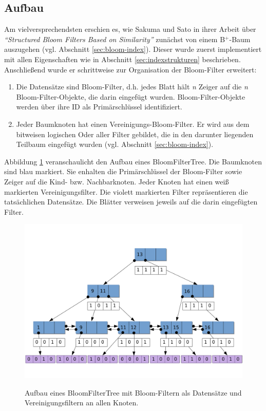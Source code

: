 \subsection{Aufbau}\label{sec:aufbau} 
Am vielversprechendsten erschien es, wie Sakuma und Sato in ihrer Arbeit über \textit{"`Structured Bloom Filters Based on Similarity"'} \cite{Sakuma2011} zunächst von einem B$^+$-Baum auszugehen (vgl. Abschnitt \ref{sec:bloom-index}). Dieser wurde zuerst implementiert mit allen Eigenschaften wie in Abschnitt \ref{sec:indexstrukturen} beschrieben. Anschließend wurde er schrittweise zur Organisation der Bloom-Filter erweitert: 
\begin{enumerate}
\setlength{\itemsep}{20pt}
	\item Die Datensätze sind Bloom-Filter, d.h. jedes Blatt hält \textit{n} Zeiger auf die \textit{n} Bloom-Filter-Objekte, die darin eingefügt wurden. Bloom-Filter-Objekte werden über ihre ID als Primärschlüssel identifiziert. 
	\item Jeder Baumknoten hat einen Vereinigungs-Bloom-Filter. Er wird aus dem bitweisen logischen Oder aller Filter gebildet, die in den darunter liegenden Teilbaum eingefügt wurden (vgl. Abschnitt \ref{sec:bloom-index}).
\end{enumerate}
Abbildung \ref{fig:pic6} veranschaulicht den Aufbau eines BloomFilterTree. Die Baumknoten sind blau markiert. Sie enhalten die Primärschlüssel der Bloom-Filter sowie Zeiger auf die Kind- bzw. Nachbarknoten. Jeder Knoten hat einen weiß markierten Vereinigungsfilter. Die violett markierten Filter repräsentieren die tatsächlichen Datensätze. Die Blätter verweisen jeweils auf die darin eingefügten Filter.
\begin{figure}[hpbt]
  \centering
  \includegraphics[width=1.0\textwidth]{pictures/bloom-filter-tree2.png}\\
  \caption[Aufbau eines BloomFilterTree]{Aufbau eines BloomFilterTree mit Bloom-Filtern als Datensätze und Vereinigungsfiltern an allen Knoten.}\label{fig:pic6}
\end{figure}
